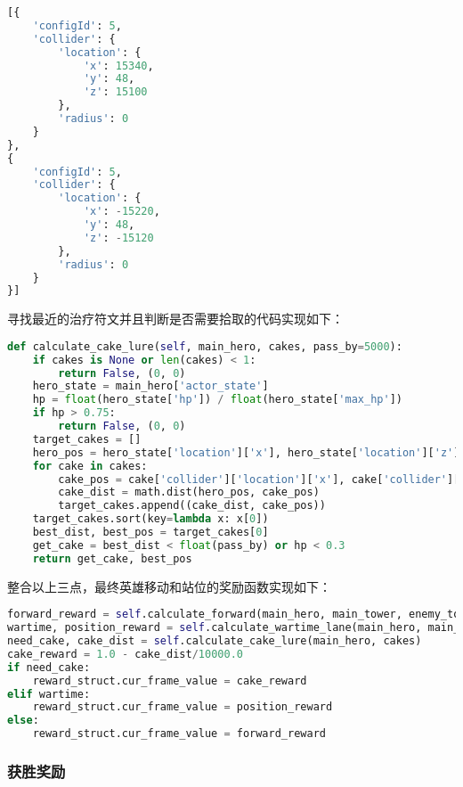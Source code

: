 \begin{lstlisting}[language=Python]
[{
    'configId': 5,
    'collider': {
        'location': {
            'x': 15340,
            'y': 48,
            'z': 15100
        },
        'radius': 0
    }
},
{
    'configId': 5,
    'collider': {
        'location': {
            'x': -15220,
            'y': 48,
            'z': -15120
        },
        'radius': 0
    }
}]
\end{lstlisting}

寻找最近的治疗符文并且判断是否需要拾取的代码实现如下：

\begin{lstlisting}[language=Python]
def calculate_cake_lure(self, main_hero, cakes, pass_by=5000):
    if cakes is None or len(cakes) < 1:
        return False, (0, 0)
    hero_state = main_hero['actor_state']
    hp = float(hero_state['hp']) / float(hero_state['max_hp'])
    if hp > 0.75:
        return False, (0, 0)
    target_cakes = []
    hero_pos = hero_state['location']['x'], hero_state['location']['z']
    for cake in cakes:
        cake_pos = cake['collider']['location']['x'], cake['collider']['location']['z']
        cake_dist = math.dist(hero_pos, cake_pos)
        target_cakes.append((cake_dist, cake_pos))
    target_cakes.sort(key=lambda x: x[0])
    best_dist, best_pos = target_cakes[0]
    get_cake = best_dist < float(pass_by) or hp < 0.3
    return get_cake, best_pos
\end{lstlisting}

整合以上三点，最终英雄移动和站位的奖励函数实现如下：

\begin{lstlisting}[language=Python]
forward_reward = self.calculate_forward(main_hero, main_tower, enemy_tower)
wartime, position_reward = self.calculate_wartime_lane(main_hero, main_tower,enemy_tower, main_roles, enemy_roles)
need_cake, cake_dist = self.calculate_cake_lure(main_hero, cakes)
cake_reward = 1.0 - cake_dist/10000.0
if need_cake:
    reward_struct.cur_frame_value = cake_reward
elif wartime:
    reward_struct.cur_frame_value = position_reward
else:
    reward_struct.cur_frame_value = forward_reward
\end{lstlisting}

\subsubsection{获胜奖励}


